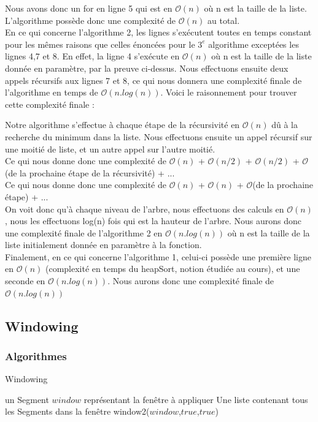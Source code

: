 \documentclass[10pt,a4paper]{article}
\begin{document}
Nous avons donc un for en ligne 5 qui est en $\mathcal{O}(n)$ où n est la taille de la liste.
L'algorithme possède donc une complexité de $\mathcal{O}(n)$ au total.
\\
En ce qui concerne l'algorithme 2, les lignes s'exécutent toutes en temps constant pour les mêmes raisons que celles énoncées pour le $3^e$ algorithme exceptées les lignes 4,7 et 8.
En effet, la ligne 4 s’exécute en $\mathcal{O}(n)$ où n est la taille de la liste donnée en paramètre, par la preuve ci-dessus. Nous effectuons ensuite deux appels récursifs aux lignes 7 et 8, ce qui nous donnera une complexité finale de l'algorithme en temps de $\mathcal{O}(n.log(n))$. Voici le raisonnement pour trouver cette complexité finale :

Notre algorithme s'effectue à chaque étape de la récursivité en $\mathcal{O}(n)$ dû à la recherche du minimum dans la liste. Nous effectuons ensuite un appel récursif sur une moitié de liste, et un autre appel sur l'autre moitié.\\ Ce qui nous donne donc une complexité de $\mathcal{O}(n)$ + $\mathcal{O}(n/2)$ + $\mathcal{O}(n/2)$ + $\mathcal{O}$(de la prochaine étape de la récursivité) + ...\\Ce qui nous donne donc une complexité de $\mathcal{O}(n)$ + $\mathcal{O}(n)$ + $\mathcal{O}$(de la prochaine étape) + ...\\ On voit donc qu'à chaque niveau de l'arbre, nous effectuons des calculs en $\mathcal{O}(n)$, nous les effectuons log(n) fois qui est la hauteur de l'arbre. Nous aurons donc une complexité finale de l’algorithme 2 en $\mathcal{O}(n.log(n))$ où n est la taille de la liste initialement donnée en paramètre à la fonction.
\\

Finalement, en ce qui concerne l'algorithme 1, celui-ci possède une première ligne en $\mathcal{O}(n)$ (complexité en temps du heapSort, notion étudiée au cours), et une seconde en $\mathcal{O}(n.log(n))$. Nous aurons donc une complexité finale de $\mathcal{O}(n.log(n))$

\subsection{Windowing}


\subsubsection{Algorithmes}

\begin{algorithm}
\caption{Windowing}
\begin{algorithmic}[1]
\REQUIRE un Segment $window$ représentant la fenêtre à appliquer
\ENSURE Une liste contenant tous les Segments dans la fenêtre
\RETURN window2($window$,$true$,$true$)
\end{algorithmic}
\end{algorithm}
\end{document}
